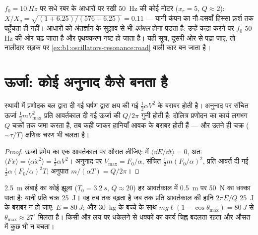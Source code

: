 \begin{example}[मशीनें कोमल आधारों पर क्यों बैठती हैं]\label{ex:b1:oscillators-resonance:mounts}
$f_0 = \qty{10}{Hz}$ पर सधे रबर के आधारों पर रखी \qty{50}{Hz} की कोई मोटर
($x_r = 5$, $Q \approx 2$): $X/X_g = \sqrt{(1 + 6.25)/(576 + 6.25)} = 0.11$
--- यानी कंपन का नौ-दसवाँ हिस्सा फ़र्श तक पहुँचता ही नहीं। आधारों को
अंतर्ज्ञान के सुझाव से भी \emph{कोमल} होना पड़ता है: उन्हें कड़ा करने पर $f_0$
$50$ Hz की ओर चढ़ जाता है और पृथक्करण नष्ट हो जाता है। यही सूत्र, दूसरी ओर
से पढ़ा जाए, तो नालीदार सड़क पर \cref{ex:b1:oscillators-resonance:road}
वाली कार बन जाता है।
\end{example}

\section{ऊर्जा: कोई अनुनाद कैसे बनता है}

\begin{proposition}[प्रणोदित व्यवस्था में ऊर्जा-संतुलन]\label{prop:b1:oscillators-resonance:energy}
स्थायी  में प्रणोदक बल द्वारा दी गई  घर्षण
द्वारा क्षय की गई  $\tfrac12\alpha V^2$ के बराबर होती है।
अनुनाद पर संचित ऊर्जा $\tfrac12 mV_{\max}^2$ प्रति आवर्तकाल दी गई ऊर्जा की
$Q/2\pi$ गुनी होती है: दोलित्र प्रणोदन का कार्य लगभग $Q$ चक्रों तक जमा
करता है, तब कहीं जाकर हानियाँ आवक के बराबर होती हैं --- और उतने ही चक्र
($\sim\tau/T$) क्षणिक चरण भी चलता है।
\end{proposition}

\begin{proof}
ऊर्जा प्रमेय का एक आवर्तकाल पर औसत लीजिए:  में
$\langle\dd E/\dd t\rangle = 0$, अतः $\langle F\dot x\rangle = \langle\alpha\dot x^2\rangle =
\tfrac12\alpha V^2$। अनुनाद पर $V_{\max} = F_0/\alpha$,
संचित $\tfrac12 m(F_0/\alpha)^2$, प्रति आवर्त दी गई $\tfrac12\alpha(F_0/\alpha)^2T$;
अनुपात $m/(\alpha T) = Q/2\pi$।
\end{proof}

\begin{example}[झूला]\label{ex:b1:oscillators-resonance:swing}
\qty{2.5}{m} लंबाई का कोई झूला ($T_0 = \qty{3.2}{s}$, $Q \approx 20$) हर
आवर्तकाल में \qty{0.5}{m} पर \qty{50}{N} का धक्का पाता है: यानी प्रति चक्र
\qty{25}{J}। वह तब तक बढ़ता है जब तक प्रति आवर्तकाल की हानि $2\pi E/Q$
\qty{25}{J} के बराबर न हो जाए: $E = \qty{80}{J}$; और \qty{30}{kg} के बच्चे
के साथ $mg\ell(1 -
\cos\theta_{\max}) = \qty{80}{J}$ से $\theta_{\max} \approx 27^\circ$ मिलता
है। किसी और लय पर धकेलने से धक्कों का कार्य चिह्न बदलता रहता और औसत में
कुछ भी न बचता।
\end{example}

